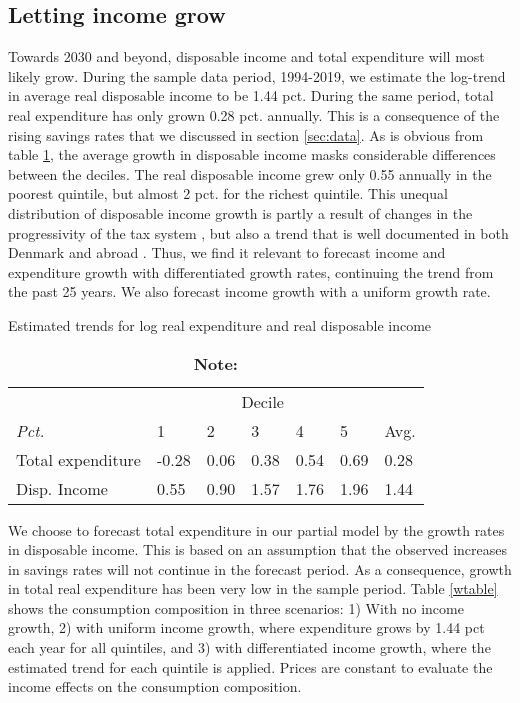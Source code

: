 \subsection{Letting income grow}\label{sec:inc_growth}
Towards 2030 and beyond, disposable income and total expenditure will most likely grow. During the sample data period, 1994-2019, we estimate the log-trend in average real disposable income to be 1.44 pct. During the same period, total real expenditure has only grown 0.28 pct. annually. This is a consequence of the rising savings rates that we discussed in section \ref{sec:data}. As is obvious from table \ref{tab:trends}, the average growth in disposable income masks considerable differences between the deciles. The real disposable income grew only 0.55 annually in the poorest quintile, but almost 2 pct. for the richest quintile. This unequal distribution of disposable income growth is partly a result of changes in the progressivity of the tax system \citep{aeskattesystem2021}, but also a trend that is well documented in both Denmark \citep{ae2019stigendeindkomstulighed} and abroad \citep{piketty2014inequality}. Thus, we find it relevant to forecast income and expenditure growth with differentiated growth rates, continuing the trend from the past 25 years. We also forecast income growth with a uniform growth rate. 

\begin{table}[H]
\centering
    \caption{Estimated trends for log real expenditure and real disposable income}
    \label{tab:trends}
\begin{tabular}{lllllll}
\toprule \hline
                 & \multicolumn{5}{c}{Decile} &               \\  \cline{2-6} 
\textit{Pct.}                 & 1     & 2    & 3    & 4    & 5    & Avg. \\ \hline
Total expenditure & -0.28 & 0.06 & 0.38 & 0.54 & 0.69 & 0.28 \\
Disp. Income     & 0.55  & 0.90 & 1.57 & 1.76 & 1.96 & 1.44 \\
\hline \bottomrule
\end{tabular}
\captionsetup{singlelinecheck=off,size=scriptsize}
\setlength{\captionmargin}{10pt}
\caption*{
\textbf{Note:} }
\end{table}

We choose to forecast total expenditure in our partial model by the growth rates in disposable income. This is based on an assumption that the observed increases in savings rates will not continue in the forecast period. As a consequence, growth in total real expenditure has been very low in the sample period. Table \ref{wtable} shows the consumption composition in three scenarios: 1) With no income growth, 2) with uniform income growth, where expenditure grows by 1.44 pct each year for all quintiles, and 3) with differentiated income growth, where the estimated trend for each quintile is applied. Prices are constant to evaluate the income effects on the consumption composition.

